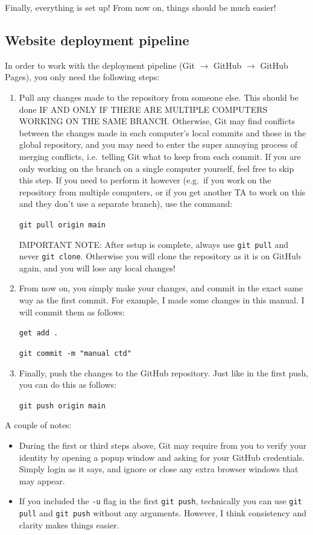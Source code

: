 \documentclass[a4paper,10pt]{article}
\begin{document}
Finally, everything is set up! From now on, things should be much easier! 

\subsection{Website deployment pipeline}

In order to work with the deployment pipeline (Git $\to$ GitHub $\to$ GitHub Pages), you only need the following steps: 
\begin{enumerate}
    \item Pull any changes made to the repository from someone else. This should be done IF AND ONLY IF THERE ARE MULTIPLE COMPUTERS WORKING ON THE SAME BRANCH. Otherwise, Git may find conflicts between the changes made in each computer's local commits and those in the global repository, and you may need to enter the super annoying process of merging conflicts, i.e.\ telling Git what to keep from each commit. If you are only working on the branch on a single computer yourself, feel free to skip this step. If you need to perform it however (e.g.\ if you work on the repository from multiple computers, or if you get another TA to work on this and they don't use a separate branch), use the command:

    \texttt{git pull origin main}

    IMPORTANT NOTE: After setup is complete, always use \texttt{git pull} and never \texttt{git clone}. Otherwise you will clone the repository as it is on GitHub again, and you will lose any local changes!  

    \item From now on, you simply make your changes, and commit in the exact same way as the first commit. For example, I made some changes in this manual. I will commit them as follows:

    \texttt{get add .}

    \texttt{git commit -m "manual ctd"}

    \item Finally, push the changes to the GitHub repository. Just like in the first push, you can do this as follows:

    \texttt{git push origin main}
\end{enumerate}
A couple of notes:
\begin{itemize}
    \item During the first or third steps above, Git may require from you to verify your identity by opening a popup window and asking for your GitHub credentials. Simply login as it says, and ignore or close any extra browser windows that may appear.
    \item If you included the \texttt{-u} flag in the first \texttt{git push}, technically you can use \texttt{git pull} and \texttt{git push} without any arguments. However, I think consistency and clarity makes things easier.
\end{itemize}
\end{document}
